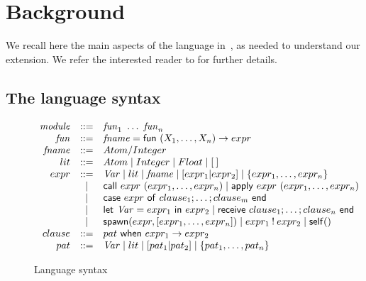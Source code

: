 \documentclass[runningheads]{llncs}
\newcommand{\ms}[1]{\mathsf{#1}}
\begin{document}
\section{Background}\label{sec:background}

We recall here the main aspects of the language in~\cite{LaneseNPV18}, as needed to understand our extension.
We refer the interested reader to \cite{LaneseNPV18} for further details. 
 
\subsection{The language syntax}

\begin{figure}[t]
\centering
  $
  \begin{array}{rcl@{~~~}rcl}
    \mathit{module} & ::= & \mathit{fun}_1~\ldots~\mathit{fun}_n \\%
    {\mathit{fun}} & ::= & \mathit{fname} = \ms{fun}~(X_1,\ldots,X_n) \to expr \\
    {\mathit{fname}} & ::= & Atom/Integer \\%
    lit & ::= & Atom \mid Integer \mid Float \mid [\:] \\
    expr & ::= & \multicolumn{4}{l}{\mathit{Var} \mid lit \mid \mathit{fname} \mid [expr_1|expr_2]
                 \mid   \{expr_1,\ldots,expr_n\}} \\
    & \mid & \multicolumn{4}{l}{\ms{call}~expr~(expr_1,\ldots,expr_n) 
    \mid \ms{apply}~expr~(expr_1,\ldots,expr_n)} \\
    & \mid &
    \multicolumn{4}{l}{\ms{case}~expr~\ms{of}~clause_1;\ldots;clause_m~\ms{end}}\\
    & \mid & \multicolumn{4}{l}{\ms{let}~\mathit{Var}=expr_1~\ms{in}~expr_2 
    \mid \ms{receive}~clause_1;\ldots;clause_n~\ms{end}}\\
    & \mid & \multicolumn{4}{l}{\ms{spawn}(expr,[expr_1,\ldots,expr_n])  
     \mid expr_1 \:!\: expr_2 \mid \ms{self}()}\\
    clause & ::= & pat ~\ms{when}~expr_1 \to expr_2
    \\%
    pat & ::= & \mathit{Var} \mid lit \mid [pat_1|pat_2] \mid
    \{pat_1,\ldots,pat_n\} \\
  \end{array}
  $
\caption{Language syntax} 
\label{fig:lang-syntax}
\end{figure}
\end{document}
